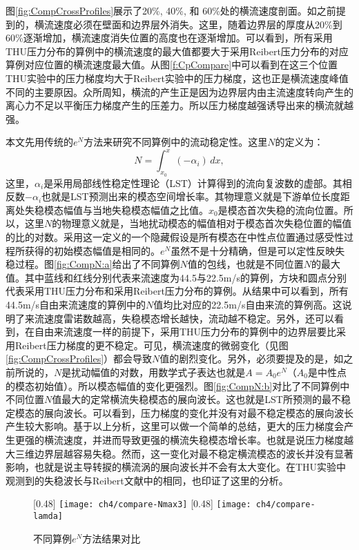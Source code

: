 图\ref{fig:CompCrossProfiles}展示了20\%, 40\%, 和 60\%处的横流速度剖面。如之前提到的，横流速度必须在壁面和边界层外消失。这里，随着边界层的厚度从20\%到60\%逐渐增加，横流速度消失位置的高度也在逐渐增加。可以看到，所有采用THU压力分布的算例中的横流速度的最大值都要大于采用Reibert压力分布的对应算例对应位置的横流速度最大值。从图\ref{f:CpCompare}中可以看到在这三个位置THU实验中的压力梯度均大于Reibert实验中的压力梯度，这也正是横流速度峰值不同的主要原因。众所周知，横流的产生正是因为边界层内由主流速度转向产生的离心力不足以平衡压力梯度产生的压差力。所以压力梯度越强诱导出来的横流就越强。

本文先用传统的$e^N$方法来研究不同算例中的流动稳定性。这里$N$的定义为：
\begin{equation}\label{e:eNdef}
  N=\int_{x_0}^x( -\alpha_i)\,dx,
\end{equation}
这里，$\alpha_i$是采用局部线性稳定性理论（LST）计算得到的流向复波数的虚部。其相反数$-\alpha_i$也就是LST预测出来的模态空间增长率。其物理意义就是下游单位长度距离处失稳模态幅值与当地失稳模态幅值之比值。$x_0$是模态首次失稳的流向位置。所以，这里$N$的物理意义就是，当地扰动模态的幅值相对于模态首次失稳位置的幅值的比的对数。采用这一定义的一个隐藏假设是所有模态在中性点位置通过感受性过程所获得的初始模态幅值是相同的。$e^N$虽然不是十分精确，但是可以定性反映失稳过程。图\ref{fig:CompN:a}给出了不同算例$N$值的包线，也就是不同位置$N$的最大值。其中蓝线和红线分别代表来流速度为44.5与22.5m/s的算例，方块和圆点分别代表采用THU压力分布和采用Reibert压力分布的算例。从结果中可以看到，所有44.5m/s自由来流速度的算例中的$N$值均比对应的22.5m/s自由来流的算例高。这说明了来流速度雷诺数越高，失稳模态增长越快，流动越不稳定。另外，还可以看到，在自由来流速度一样的前提下，采用THU压力分布的算例中的边界层要比采用Reibert压力梯度的更不稳定。可见，横流速度的微弱变化（见图\ref{fig:CompCrossProfiles}）都会导致$N$值的剧烈变化。另外，必须要提及的是，如之前所说的，$N$是扰动幅值的对数，用数学式子表达也就是$A=A_0e^{N}$（$A_0$是中性点的模态初始值）。所以模态幅值的变化更强烈。图\ref{fig:CompN:b}对比了不同算例中不同位置$N$值最大的定常横流失稳模态的展向波长。这也就是LST所预测的最不稳定模态的展向波长。可以看到，压力梯度的变化并没有对最不稳定模态的展向波长产生较大影响。基于以上分析，这里可以做一个简单的总结，更大的压力梯度会产生更强的横流速度，并进而导致更强的横流失稳模态增长率。也就是说压力梯度越大三维边界层越容易失稳。然而，这一变化对最不稳定横流模态的波长并没有显著影响，也就是说主导转捩的横流涡的展向波长并不会有太大变化。在THU实验中观测到的失稳波长与Reibert文献中的相同，也印证了这里的分析。
\begin{figure}
\centering
{} [0.48\linewidth]%
{\texttt{[image: ch4/compare-Nmax3]}}
 [0.48\linewidth] %
{\texttt{[image: ch4/compare-lamda]}}
\caption{不同算例$e^{N}$方法结果对比}
\label{fig:CompN} %
\end{figure}

